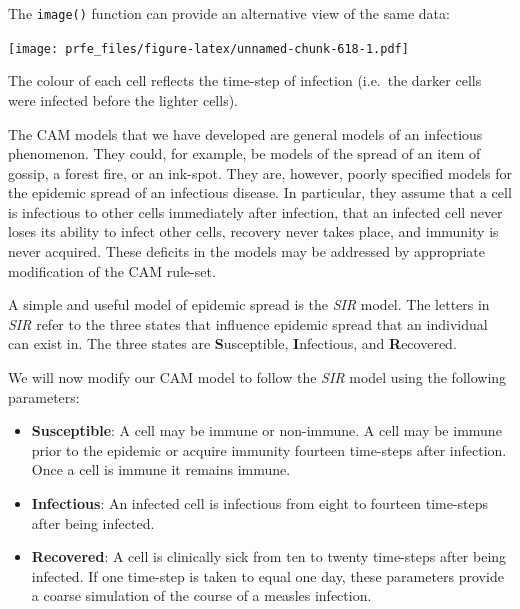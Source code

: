 \documentclass[12pt,a4paper]{book}
\newenvironment{Shaded}{\begin{snugshade}}{\end{snugshade}}
\newcommand{\DataTypeTok}[1]{\textcolor[rgb]{0.13,0.29,0.53}{#1}}
\newcommand{\KeywordTok}[1]{\textcolor[rgb]{0.13,0.29,0.53}{\textbf{#1}}}
\newcommand{\NormalTok}[1]{#1}
\newcommand{\OperatorTok}[1]{\textcolor[rgb]{0.81,0.36,0.00}{\textbf{#1}}}
\newcommand{\OtherTok}[1]{\textcolor[rgb]{0.56,0.35,0.01}{#1}}
\theoremstyle{definition}
\theoremstyle{definition}
\theoremstyle{definition}
\theoremstyle{remark}
\begin{document}
The \texttt{image()} function can provide an alternative view of the
same data:

\begin{Shaded}
\end{Shaded}

\texttt{[image: prfe\_files/figure-latex/unnamed-chunk-618-1.pdf]}

The colour of each cell reflects the time-step of infection (i.e.~the
darker cells were infected before the lighter cells).

The CAM models that we have developed are general models of an
infectious phenomenon. They could, for example, be models of the spread
of an item of gossip, a forest fire, or an ink-spot. They are, however,
poorly specified models for the epidemic spread of an infectious
disease. In particular, they assume that a cell is infectious to other
cells immediately after infection, that an infected cell never loses its
ability to infect other cells, recovery never takes place, and immunity
is never acquired. These deficits in the models may be addressed by
appropriate modification of the CAM rule-set.

A simple and useful model of epidemic spread is the \emph{SIR} model.
The letters in \emph{SIR} refer to the three states that influence
epidemic spread that an individual can exist in. The three states are
\textbf{S}usceptible, \textbf{I}nfectious, and \textbf{R}ecovered.

We will now modify our CAM model to follow the \emph{SIR} model using
the following parameters:

\begin{itemize}
\item
  \textbf{Susceptible}: A cell may be immune or non-immune. A cell may
  be immune prior to the epidemic or acquire immunity fourteen
  time-steps after infection. Once a cell is immune it remains immune.
\item
  \textbf{Infectious}: An infected cell is infectious from eight to
  fourteen time-steps after being infected.
\item
  \textbf{Recovered}: A cell is clinically sick from ten to twenty
  time-steps after being infected. If one time-step is taken to equal
  one day, these parameters provide a coarse simulation of the course of
  a measles infection.
\end{itemize}
\end{document}
